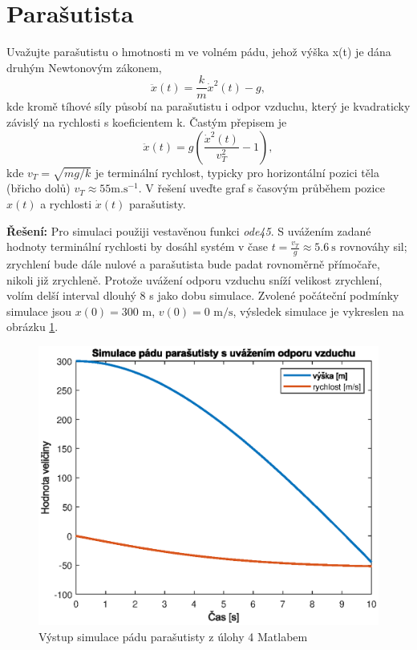 \documentclass[twoside]{article}
\begin{document}
\section{Parašutista}
Uvažujte parašutistu o hmotnosti m ve volném pádu, jehož výška x(t) je dána druhým Newtonovým zákonem,
\begin{equation}
	\ddot{x}(t) = \frac{k}{m}\dot{x}^2(t) - g,
\end{equation}
kde kromě tíhové síly působí na parašutistu i odpor vzduchu, který je kvadraticky závislý na rychlosti s koeficientem
k. Častým přepisem je
\begin{equation}
	\ddot{x}(t) = g\left(\frac{\dot{x}^2(t)}{v_T^2} - 1\right),
\end{equation}
kde $v_T = \sqrt{mg/k}$ je terminální rychlost, typicky pro horizontální pozici těla (břicho dolů) $v_T \approx 55 \text{m.s}^{-1}$. V řešení
uveďte graf s časovým průběhem pozice $x(t)$ a rychlosti $\dot{x}(t)$ parašutisty.

\textbf{Řešení:}
Pro simulaci použiji vestavěnou funkci \textit{ode45}. S uvážením zadané hodnoty terminální rychlosti
by dosáhl systém v čase $t = \frac{v_T}{g} \approx 5.6~\text{s}$ rovnováhy sil; zrychlení bude dále nulové a parašutista bude
padat rovnoměrně přímočaře, nikoli již zrychleně. Protože uvážení odporu vzduchu sníží velikost zrychlení, volím 
delší interval dlouhý 8 s jako dobu simulace. Zvolené počáteční podmínky simulace jsou $x(0) = 300\text{ m}$, $v(0) = 0 \text{ m/s}$, 
výsledek simulace je vykreslen na obrázku \ref{fig:parasutista}.

\begin{figure}[htb]
	\centering
	\includegraphics{parasutista.eps}
	\caption{Výstup simulace pádu parašutisty z úlohy 4 Matlabem}
	\label{fig:parasutista}
\end{figure}
\end{document}

